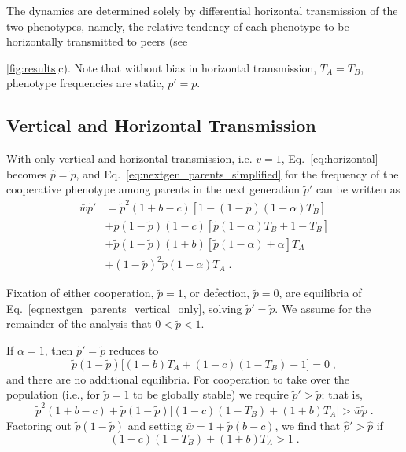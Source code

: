 \documentclass[12pt]{extarticle}
\begin{document}
The dynamics are determined solely by differential horizontal transmission of the two phenotypes, namely, the relative tendency of each phenotype to be horizontally transmitted to peers (see~{\autoref{fig:results}c).
Note that without bias in horizontal transmission, $T_A = T_B$, phenotype frequencies are static, $p'=p$.


\subsection*{Vertical and Horizontal Transmission}

With only vertical and horizontal transmission, i.e. $v=1$, Eq.\ \ref{eq:horizontal} becomes
$\hat{p} =  \tilde{p}$,
and Eq.\ \ref{eq:nextgen_parents_simplified} for the frequency of the cooperative phenotype among parents in the next generation $\tilde{p}'$ can be written as
\begin{equation} \label{eq:nextgen_parents_vertical_only} 
\begin{aligned}
\bar{w} \tilde{p}' 
& = \tilde{p}^2 (1+b-c) [1 - (1-\tilde{p}) (1-\alpha) T_B] \\
& + \tilde{p}(1-\tilde{p}) (1-c) [\tilde{p} (1-\alpha) T_B + 1 - T_B] \\
& + \tilde{p}(1-\tilde{p}) (1+b) [\tilde{p} (1-\alpha) + \alpha] T_A \\
& + (1-\tilde{p})^2 \tilde{p} (1-\alpha) T_A \;.
\end{aligned}
\end{equation}

Fixation of either cooperation, $\tilde{p}=1$, or defection, 
$\tilde{p}=0$, are equilibria of Eq.\ \ref{eq:nextgen_parents_vertical_only}, solving $\tilde{p}'= \tilde{p}$.
We assume for the remainder of the analysis that $0<\tilde{p}<1$.

If $\alpha=1$, then $\tilde{p}'= \tilde{p}$ reduces to
\begin{equation}
\tilde{p}(1-\tilde{p})\big[(1+b)T_A + (1-c)(1-T_B)-1\big] = 0 \;,
\end{equation}
and there are no additional equilibria.
For cooperation to take over the population (i.e., for $\tilde{p}=1$ to be globally stable) we require $\tilde{p}'>\tilde{p}$; that is,
\begin{equation}
  \tilde{p}^2 (1+b-c) + \tilde{p}(1-\tilde{p}) \big[(1-c) (1 - T_B) + (1+b)T_A\big] 
  > \bar{w}\tilde{p} \;.
\end{equation}
Factoring out $\tilde{p}(1-\tilde{p})$ and setting $\bar{w} = 1 + \tilde{p}(b-c)$, we find that $\hat{p}'>\hat{p}$ if
\begin{equation} \label{eq:vert_hori_alpha1_condition_proof}
  (1-c) (1 - T_B) + (1+b)T_A > 1 \;.
\end{equation}
\\

}
\end{document}
